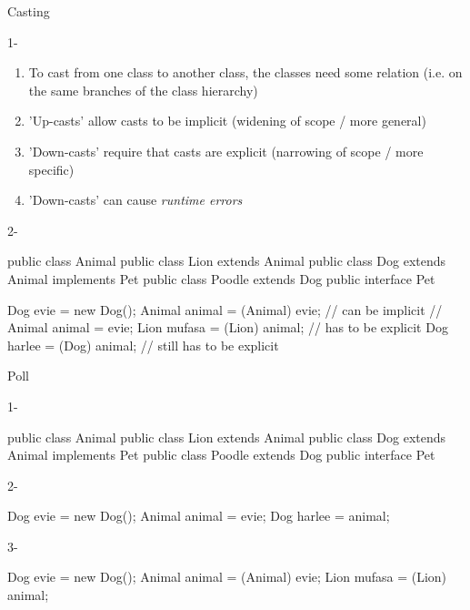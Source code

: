 \documentclass[week3]{csse2002}
\begin{document}
\begin{topic}{Casting}
\begin{subtopic}{1-}
\begin{enumerate}
	\item To cast from one class to another class, the classes need some relation (i.e. on the same branches of the class hierarchy)
	\item 'Up-casts' allow casts to be implicit (widening of scope / more general)
	\item 'Down-casts' require that casts are explicit (narrowing of scope / more specific)
	\item 'Down-casts' can cause \emph{runtime errors}
\end{enumerate}
\end{subtopic}

\begin{subtopic}{2-}
\begin{java}
public class Animal {}
public class Lion extends Animal {}
public class Dog extends Animal implements Pet {}
public class Poodle extends Dog {}
public interface Pet {}

Dog evie = new Dog();
Animal animal = (Animal) evie; // can be implicit
// Animal animal = evie;
Lion mufasa = (Lion) animal; // has to be explicit
Dog harlee = (Dog) animal; // still has to be explicit
\end{java}
\end{subtopic}
\end{topic}

\begin{topic}{Poll}
\begin{subtopic}{1-}
\begin{java}
public class Animal {}
public class Lion extends Animal {}
public class Dog extends Animal implements Pet {}
public class Poodle extends Dog {}
public interface Pet {}
\end{java}
\end{subtopic}

\begin{subtopic}{2-}
\begin{java}
Dog evie = new Dog();
Animal animal = evie;
Dog harlee = animal;
\end{java}
\end{subtopic}

\begin{subtopic}{3-}
\begin{java}
Dog evie = new Dog();
Animal animal = (Animal) evie;
Lion mufasa = (Lion) animal;
\end{java}
\end{subtopic}
\end{topic}
\end{document}
